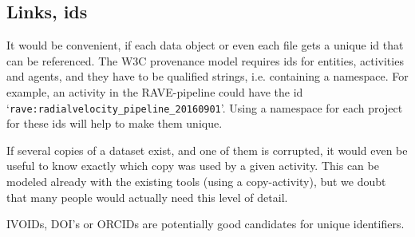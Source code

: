 \subsection{Links, ids}\label{sec:links_between_data}
It would be convenient, if each data object or even each file 
gets a unique id that can be referenced. The W3C provenance model requires ids
for entities, activities and agents, and they have to be qualified strings, 
i.e. containing a namespace. For example, an activity in the RAVE-pipeline could 
have the id `\texttt{rave:radialvelocity\_pipeline\_20160901}'. Using a namespace for each 
project for these ids will help to make them unique. 

If several copies of a dataset exist, and one of them is corrupted, it would even be useful to know
exactly which copy was used by a given activity. This can be modeled already 
with the existing tools (using a copy-activity), but we doubt that many people
would actually need this level of detail.

IVOIDs, DOI's or ORCIDs are potentially good candidates for unique identifiers.






